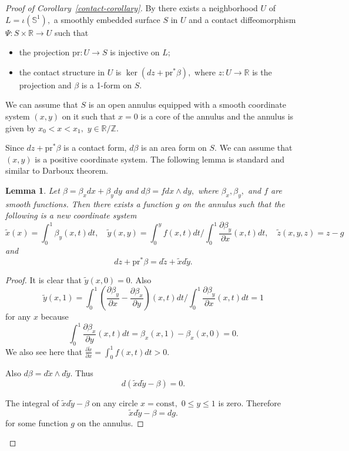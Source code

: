 \documentclass[12pt]{article}
\newtheorem{lemm}[prop]{Lemma}
\theoremstyle{definition}
\begin{document}
\begin{proof}[Proof of Corollary~\ref{contact-corollary}]
By \cite[Proposition 5.26]{Pra} there exists a neighborhood $U$ of $L = \iota(\mathbb S^1),$ a smoothly embedded surface $S$ in $U$ and a contact diffeomorphism $\Psi:S\times\mathbb R\to U$ such that
\begin{itemize}
\item
the projection $\mathrm{pr}:U\to S$ is injective on $L$;
\item
the contact structure in $U$ is $\ker(dz + \mathrm{pr}^*\beta),$ where $z:U\to\mathbb R$ is the projection and $\beta$ is a 1-form on $S$.
\end{itemize}

We can assume that $S$ is an open annulus equipped with a smooth coordinate system $(x, y)$ on it such that $x=0$ is a core of the annulus and the annulus is given by $x_0< x<x_1,$ $y\in\mathbb R/\mathbb Z.$

Since $dz + \mathrm{pr}^*\beta$ is a contact form, $d\beta$ is an area form on $S.$  We can assume that $(x,y)$ is a positive coordinate system. The following lemma is standard and similar to Darboux theorem.

\begin{lemm}
Let $\beta = \beta_x dx + \beta_y dy$ and $d\beta = fdx\wedge dy,$ where $\beta_x, \beta_y,$ and $f$ are smooth functions.
Then there exists a function $g$ on the annulus such that the following is a new coordinate system
$$\widetilde x\left( x\right) = \int_0^1 \beta_y (x,t) dt, \quad
\widetilde y( x, y) = \int_0^{y} f(x, t) dt / \int_0^1 \frac{\partial \beta_y}{\partial x} (x,t) dt,\quad
\widetilde z(x,y,z) = z - g
$$
and
$$
dz + \mathrm{pr}^*\beta = d\widetilde z + \widetilde xd\widetilde y.
$$
\end{lemm}

\begin{proof}
It is clear that $\widetilde y(x, 0) = 0.$ Also 
$$
\widetilde y(x, 1) = \int_0^1 \left(\frac{\partial \beta_y}{\partial x} - \frac{\partial \beta_x}{\partial y}\right)(x,t) dt / \int_0^1 \frac{\partial \beta_y}{\partial x} (x,t) dt = 1$$
for any $x$ because 
$$
\int_0^1 \frac{\partial \beta_x}{\partial y}(x,t) dt = \beta_x(x,1) - \beta_x(x,0) = 0.
$$
We also see here that $\frac{\partial\widetilde x}{\partial x} = \int_0^1 f(x,t)dt>0.$

Also
$
d\beta = d \widetilde x\wedge d\widetilde y.
$
Thus 
$$
d(\widetilde xd\widetilde y - \beta) = 0.
$$

The integral of $\widetilde xd\widetilde y - \beta$ on any circle $x = \mathrm{const},$ $0\le y\le 1$ is zero. Therefore
$$
\widetilde xd\widetilde y - \beta = dg.
$$
for some function $g$ on the annulus.


\end{proof}
\end{proof}
\end{document}
